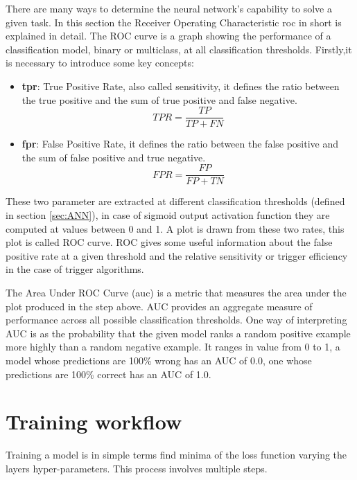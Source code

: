 \documentclass[../../main.tex]{subfiles}
\begin{document}
There are many ways to determine the neural network's capability to solve a given task. In this section the Receiver Operating Characteristic \acrshort{roc} in short is explained in detail.  
The ROC curve is a graph showing the performance of a classification model, binary or multiclass, at all classification thresholds. Firstly,it is necessary to introduce some key concepts:
\begin{itemize}
    \item \textbf{\acrshort{tpr}}: True Positive Rate, also called sensitivity, it defines the ratio between the true positive and the sum of  true positive and false negative.
    \begin{equation}
        TPR = \frac{TP}{TP+FN}
    \end{equation}
    \item \textbf{\acrshort{fpr}}: False Positive Rate, it defines the ratio between the false positive and the sum of false positive and true negative.
    \begin{equation}
        FPR = \frac{FP}{FP+TN}
    \end{equation}
\end{itemize}
These two parameter are extracted at different classification thresholds (defined in section \ref{sec:ANN}), in case of sigmoid output activation function they are computed at values between 0 and 1. A plot is drawn from these two rates, this plot is called ROC curve.
ROC gives some useful information about the false positive rate at a given threshold and the relative sensitivity or trigger efficiency in the case of trigger algorithms.  

The Area Under ROC Curve (\acrshort{auc}) is a metric that measures the area under the plot produced in the step above. AUC provides an aggregate measure of performance across all possible classification thresholds. One way of interpreting AUC is as the probability that the given model ranks a random positive example more highly than a random negative example. It ranges in value from 0 to 1, a model whose predictions are 100\% wrong has an AUC of 0.0, one whose predictions are 100\% correct has an AUC of 1.0.
    
\section{Training workflow}
\label{sec:NN_training}

Training a model is in simple terms find minima of the loss function varying the layers hyper-parameters. This process involves multiple steps.
\end{document}
